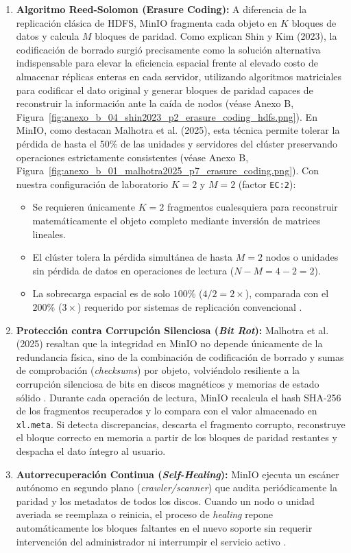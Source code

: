 \documentclass[12pt,a4paper]{article}
\begin{document}
\begin{enumerate}[leftmargin=*]
    \item \textbf{Algoritmo Reed-Solomon (Erasure Coding):} A diferencia de la replicación clásica de HDFS, MinIO fragmenta cada objeto en $K$ bloques de datos y calcula $M$ bloques de paridad. Como explican Shin y Kim (2023), la codificación de borrado surgió precisamente como la solución alternativa indispensable para elevar la eficiencia espacial frente al elevado costo de almacenar réplicas enteras en cada servidor, utilizando algoritmos matriciales para codificar el dato original y generar bloques de paridad capaces de reconstruir la información ante la caída de nodos \cite{shin2023cache} (véase Anexo B, Figura~\ref{fig:anexo_b_04_shin2023_p2_erasure_coding_hdfs.png}). En MinIO, como destacan Malhotra et al. (2025), esta técnica permite tolerar la pérdida de hasta el 50\% de las unidades y servidores del clúster preservando operaciones estrictamente consistentes \cite{malhotra2025evaluating} (véase Anexo B, Figura~\ref{fig:anexo_b_01_malhotra2025_p7_erasure_coding.png}). Con nuestra configuración de laboratorio $K=2$ y $M=2$ (factor \texttt{EC:2}):
    \begin{itemize}
        \item Se requieren únicamente $K=2$ fragmentos cualesquiera para reconstruir matemáticamente el objeto completo mediante inversión de matrices lineales.
        \item El clúster tolera la pérdida simultánea de hasta $M=2$ nodos o unidades sin pérdida de datos en operaciones de lectura ($N - M = 4 - 2 = 2$).
        \item La sobrecarga espacial es de solo $100\%$ ($4/2 = 2\times$), comparada con el $200\%$ ($3\times$) requerido por sistemas de replicación convencional \cite{shin2023cache}.
    \end{itemize}
    \item \textbf{Protección contra Corrupción Silenciosa (\emph{Bit Rot}):} Malhotra et al. (2025) resaltan que la integridad en MinIO no depende únicamente de la redundancia física, sino de la combinación de codificación de borrado y sumas de comprobación (\emph{checksums}) por objeto, volviéndolo resiliente a la corrupción silenciosa de bits en discos magnéticos y memorias de estado sólido \cite{malhotra2025evaluating}. Durante cada operación de lectura, MinIO recalcula el hash SHA-256 de los fragmentos recuperados y lo compara con el valor almacenado en \texttt{xl.meta}. Si detecta discrepancias, descarta el fragmento corrupto, reconstruye el bloque correcto en memoria a partir de los bloques de paridad restantes y despacha el dato íntegro al usuario.
    \item \textbf{Autorrecuperación Continua (\emph{Self-Healing}):} MinIO ejecuta un escáner autónomo en segundo plano (\emph{crawler/scanner}) que audita periódicamente la paridad y los metadatos de todos los discos. Cuando un nodo o unidad averiada se reemplaza o reinicia, el proceso de \emph{healing} repone automáticamente los bloques faltantes en el nuevo soporte sin requerir intervención del administrador ni interrumpir el servicio activo \cite{malhotra2025evaluating}.
\end{enumerate}
\end{document}
